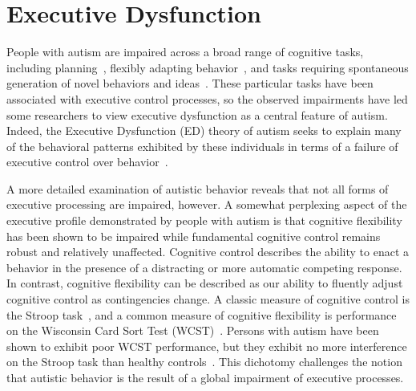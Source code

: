 %
%

\section{Executive Dysfunction}
People with autism are impaired across a
broad range of cognitive tasks, including
planning~\cite{BennettoL:1996:AutismPlanningWCST}, flexibly adapting
behavior~\cite{BennettoL:1996:AutismPlanningWCST,Ozonoff:1999:AutismStroopWCST},
and tasks requiring spontaneous generation of novel behaviors and
ideas~\cite{TurnerW:1999:AutismGenerativity}.  These particular tasks have
been associated with executive control processes, so the observed
impairments have led some researchers to view executive dysfunction as
a central feature of autism.  Indeed, the Executive Dysfunction (ED)
theory of autism seeks to explain many of the behavioral patterns
exhibited by these individuals in terms of a failure of executive
control over behavior~\cite{HughesC:1994:AutismExecutiveDysfunction}.


A more detailed examination of autistic behavior reveals that not all
forms of executive processing are impaired, however.  A somewhat
perplexing aspect of the executive profile demonstrated by people with
autism is that cognitive flexibility has been shown to be impaired
while fundamental cognitive control remains robust and relatively
unaffected.  Cognitive control describes the ability to enact a
behavior in the presence of a distracting or more automatic competing
response.  In contrast, cognitive flexibility can be described as our
ability to fluently adjust cognitive control as contingencies change.
A classic measure of cognitive control is the Stroop
task~\cite{StroopJR:1935:Interference}, and a common measure of
cognitive flexibility is performance on the Wisconsin Card Sort Test
(WCST)~\cite{BergEA:1948:WCST}.  Persons with autism have been shown
to exhibit poor WCST performance, but they exhibit no more
interference on the Stroop task than healthy
controls~\cite{Ozonoff:1999:AutismStroopWCST}.  This dichotomy
challenges the notion that autistic behavior is the result of a global
impairment of executive processes.%

